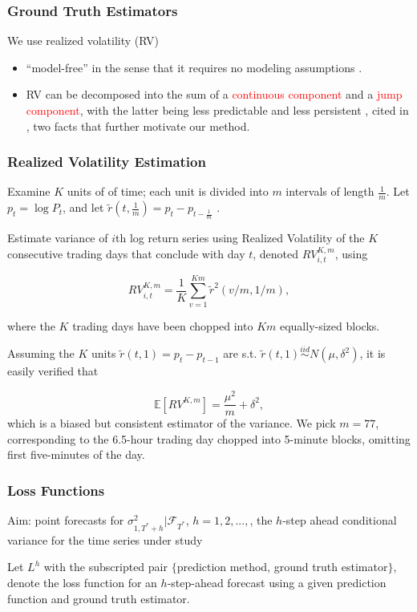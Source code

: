 \documentclass[9pt]{beamer}
\newcommand{\simiid}{\stackrel{iid}{\sim}} %
\def\E{\mathbb{E}} %
\theoremstyle{definition}
\begin{document}
\begin{frame}
\frametitle{Ground Truth Estimators}

We use realized volatility (RV)
\begin{itemize}
\item ``model-free'' in the sense that it requires no modeling assumptions \parencite[][]{andersen2010stochastic}.  
\item RV can be decomposed into the sum of a \textcolor{red}{continuous component} and a \textcolor{red}{jump component}, with the latter being less predictable and less persistent \parencite[][]{andersen2007roughing}, cited in \cite[][]{de2006forecasting}, two facts that further motivate our method.
\end{itemize}

\end{frame}

\begin{frame}
    \frametitle{Realized Volatility Estimation}

Examine $K$ units of of time; each unit is divided into $m$ intervals of length $\frac{1}{m}$.  Let $p_{t} = \log{P_{t}}$, and let $\tilde{r}(t,\frac{1}{m}) = p_{t} - p_{t-\frac{1}{m}}$  \parencite[][]{andersen2009realized}. 

\bigbreak

Estimate variance of $i$th log return series using Realized Volatility of the $K$ consecutive trading days that conclude with day $t$, denoted $RV_{i,t}^{K,m}$, using

$$RV_{i,t}^{K,m} = \frac{1}{K}\sum^{Km}_{v=1}\tilde{r}^{2}(v/m,1/m),$$

where the $K$ trading days have been chopped into $Km$ equally-sized blocks.

Assuming the $K$ units $\tilde{r}(t, 1) = p_{t} - p_{t-1}$ are s.t. $\tilde{r}(t, 1) \simiid N(\mu, \delta^{2})$, it is easily verified that 

$$\E[RV^{K,m}] = \frac{\mu^{2}}{m} + \delta^{2},$$
which is a biased but consistent estimator of the variance.  We pick $m = 77$, corresponding to the 6.5-hour trading day chopped into 5-minute blocks, omitting first five-minutes of the day.

\end{frame}

\begin{frame}
\frametitle{Loss Functions}

Aim: point forecasts for $\sigma^{2}_{1,T^{*}+h}|\mathcal{F}_{T^{*}}$, $h=1,2,...,$, the $h$-step ahead conditional variance for the time series under study\\

\bigbreak
 
Let $L^{h}$ with the subscripted pair $\{$prediction method, ground truth estimator$\}$, denote the loss function for an $h$-step-ahead forecast using a given prediction function and ground truth estimator.  

\end{frame}
\end{document}
